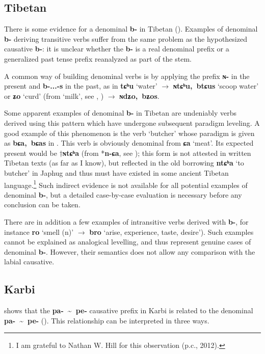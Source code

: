 \documentclass[oneside,a4paper,11pt]{article}
\newcommand{\ipa}[1]{\textbf{{\phon\mbox{#1}}}} %
\newcommand{\tld}{\textasciitilde{}}
\begin{document}
\subsection{Tibetan} \label{sec:tib.denom}
There is some evidence for a denominal \ipa{b-} in Tibetan (\citealt[250-1]{zhang09cizu}). Examples of denominal \ipa{b-} deriving transitive verbs suffer from the same problem as the hypothesized causative \ipa{b-}: it is unclear whether the \ipa{b-} is a real denominal prefix or a generalized past tense prefix reanalyzed as part of the stem.

A common way of building denominal verbs is by applying the prefix \ipa{ɴ-} in the present and \ipa{b-...-s} in the past, as in \ipa{tɕʰu} `water' $\rightarrow$ \ipa{ɴtɕʰu, btɕus} `scoop water' or \ipa{ʑo} `curd' (from `milk', see \citealt[29-30]{jacques14tangoute},  \citealt{tournadre15chocha}) $\rightarrow$ \ipa{ɴdʑo, bʑos}.

Some apparent examples of denominal \ipa{b-} in Tibetan are undeniably verbs derived using this pattern which have undergone subsequent paradigm leveling. A good example of this phenomenon is the verb `butcher' whose paradigm is given as \ipa{bɕa, bɕas} in \citet{bodrgya}. This verb is obviously denominal from \ipa{ɕa} `meat'. Its expected present would be $\dagger$\ipa{ɴtɕʰa} (from *\ipa{n-ɕa}, see \citealt{lifk33}); this form is not attested in written Tibetan texts (as far as I know), but reflected in the old borrowing \ipa{ntɕʰa} `to butcher' in Japhug and thus must have existed in some ancient Tibetan language.\footnote{I am grateful to Nathan W. Hill for this observation (p.c., 2012).} Such indirect evidence is not available for all potential examples of denominal \ipa{b-}, but a detailed case-by-case evaluation is necessary before any conclusion can be taken.

There are in addition a few examples of intransitive verbs derived with \ipa{b-}, for  instance \ipa{ro}  `smell (n)' $\rightarrow$ \ipa{bro}  `arise, experience, taste, desire'). Such examples cannot be explained as analogical levelling, and thus represent genuine cases of denominal \ipa{b-}. However, their semantics does not allow any comparison with the labial causative.


\subsection{Karbi} \label{sec:karbi.denom}
\citet[238]{konnerth14karbi} shows that the  \ipa{pa- \tld{} pe-} causative prefix in Karbi is related to the denominal  \ipa{pa- \tld{} pe-} (\citealt[205]{konnerth14karbi}). This relationship can be interpreted in three ways. 
\end{document}
